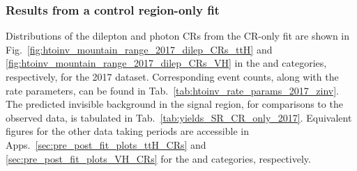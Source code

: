 



\subsubsection{Results from a control region-only fit}
\label{subsubsec:htoinv_zinv_CR_only_fit}

Distributions of the dilepton and photon \glspl{CR} from the \gls{CR}-only fit are shown in Fig.~\ref{fig:htoinv_mountain_range_2017_dilep_CRs_ttH} and \ref{fig:htoinv_mountain_range_2017_dilep_CRs_VH} in the \ttH and \VH categories, respectively, for the 2017 dataset. Corresponding event counts, along with the rate parameters, can be found in Tab.~\ref{tab:htoinv_rate_params_2017_zinv}. The predicted invisible \PZ background in the signal region, for comparisons to the observed data, is tabulated in Tab.~\ref{tab:yields_SR_CR_only_2017}. Equivalent figures for the other data taking periods are accessible in Apps.~\ref{sec:pre_post_fit_plots_ttH_CRs} and \ref{sec:pre_post_fit_plots_VH_CRs} for the \ttH and \VH categories, respectively.

